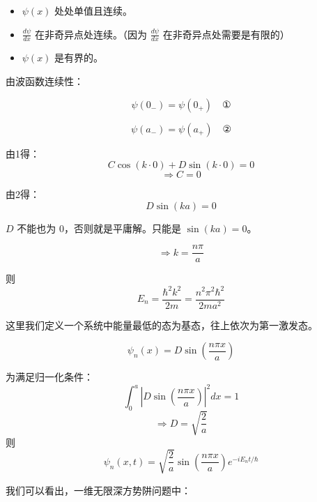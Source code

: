 \documentclass[lang=cn,15pt]{elegantbook}
\begin{document}
\begin{itemize}
	\item $\psi(x)$ 处处单值且连续。
	\item $\frac{d\psi}{dx}$ 在非奇异点处连续。（因为 $\frac{d\psi}{dx}$ 在非奇异点处需要是有限的）
	\item $\psi(x)$ 是有界的。
\end{itemize}

由波函数连续性：

\begin{equation*}
	\psi(0_-) = \psi(0_+) \quad \text{①}
\end{equation*}

\begin{equation*}
	\psi(a_-) = \psi(a_+) \quad \text{②}
\end{equation*}

由1得：
\[
C\cos(k \cdot 0) + D\sin(k \cdot 0) = 0
\]
\[
\Rightarrow C = 0
\]

由2得：
\[
D\sin(ka) = 0
\]

\(D\) 不能也为 0，否则就是平庸解。只能是 \(\sin(ka) = 0\)。

\[
\Rightarrow k = \frac{n\pi}{a}
\]

则
\[
E_n = \frac{\hbar^2 k^2}{2m} = \frac{n^2 \pi^2 \hbar^2}{2ma^2}
\]

这里我们定义一个系统中能量最低的态为基态，往上依次为第一激发态。

\[
\psi_n(x) = D\sin\left(\frac{n\pi x}{a}\right)
\]

为满足归一化条件：
\[
\int_0^a \left|D\sin\left(\frac{n\pi x}{a}\right)\right|^2 dx = 1
\]
\[
\Rightarrow D = \sqrt{\frac{2}{a}}
\]
则
\[
\psi_n(x,t) = \sqrt{\frac{2}{a}} \sin\left(\frac{n\pi x}{a}\right) e^{-iE_n t/\hbar}
\]

我们可以看出，一维无限深方势阱问题中：
\end{document}
